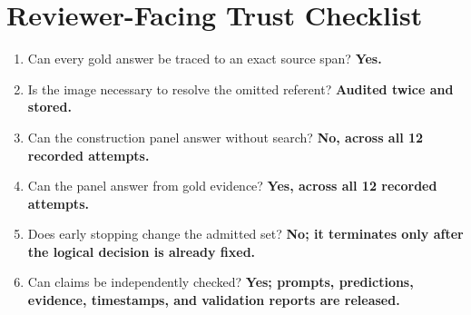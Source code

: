 \documentclass{article}
\begin{document}
\section{Reviewer-Facing Trust Checklist}
\begin{enumerate}[leftmargin=*]
  \item Can every gold answer be traced to an exact source span? \textbf{Yes.}
  \item Is the image necessary to resolve the omitted referent? \textbf{Audited
  twice and stored.}
  \item Can the construction panel answer without search? \textbf{No, across
  all 12 recorded attempts.}
  \item Can the panel answer from gold evidence? \textbf{Yes, across all 12
  recorded attempts.}
  \item Does early stopping change the admitted set? \textbf{No; it terminates
  only after the logical decision is already fixed.}
  \item Can claims be independently checked? \textbf{Yes; prompts,
  predictions, evidence, timestamps, and validation reports are released.}
\end{enumerate}
\end{document}
